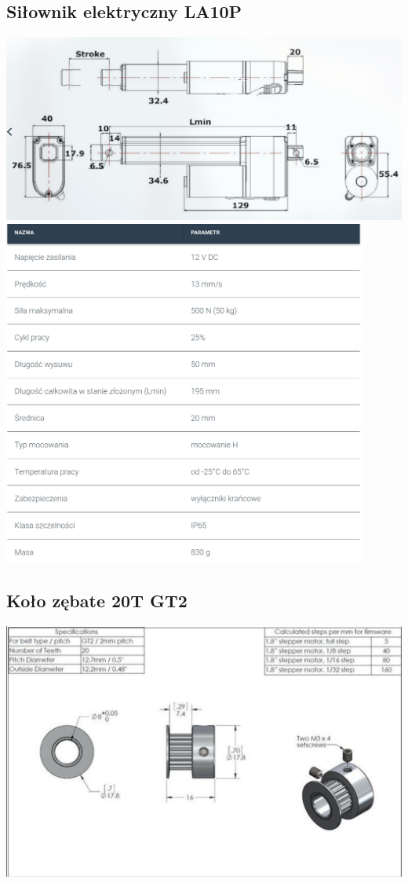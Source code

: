 \documentclass[a4paper,12pt, openany]{article}
\begin{document}
\subsection{Siłownik elektryczny LA10P}
\begin{center}
 \includegraphics[width=\textwidth]{silownik.png}
\includegraphics[width=0.9\textwidth]{silownik2.png}
\end{center}




\subsection{Koło zębate 20T GT2}
\includegraphics[width=\textwidth]{gt2.png}
\end{document}

